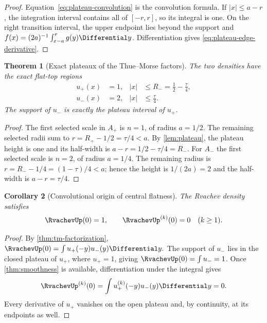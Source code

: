 \documentclass[11pt,oneside]{article}
\numberwithin{equation}{section}
\newtheorem{theorem}{Theorem}[section]
\newtheorem{corollary}[theorem]{Corollary}
\theoremstyle{definition}
\theoremstyle{remark}
\begin{document}
\begin{proof}
Equation~\eqref{eq:plateau-convolution} is the convolution formula.  If
$|x|\le a-r$, the integration interval contains all of $[-r,r]$, so its integral is one.
On the right transition interval, the upper endpoint lies beyond the support and
$f(x)=(2a)^{-1}\int_{x-a}^r g(y)\Differential y$.  Differentiation gives
\eqref{eq:plateau-edge-derivative}.
\end{proof}

\begin{theorem}[Exact plateaux of the Thue--Morse factors]
\label{thm:exact-plateaux}
The two densities have the exact flat-top regions
\begin{align}
 u_+(x)&=1,
 & |x|&\le R_-=\frac12-\frac\tau4,
 \label{eq:uplus-plateau}\\
 u_-(x)&=2,
 & |x|&\le\frac\tau4.
 \label{eq:uminus-plateau}
\end{align}
The support of $u_-$ is exactly the plateau interval of $u_+$.
\end{theorem}

\begin{proof}
The first selected scale in $A_+$ is $n=1$, of radius $a=1/2$.  The remaining selected
radii sum to $r=R_+-1/2=\tau/4<a$.  By \cref{lem:plateau}, the plateau height is one and
its half-width is $a-r=1/2-\tau/4=R_-$.  For $A_-$ the first selected scale is $n=2$,
of radius $a=1/4$.  The remaining radius is
$r=R_--1/4=(1-\tau)/4<a$; hence the height is $1/(2a)=2$ and the half-width is
$a-r=\tau/4$.
\end{proof}

\begin{corollary}[Convolutional origin of central flatness]
\label{cor:central-flatness}
The Rvachev density satisfies
\begin{equation}
 \RvachevUp(0)=1,
 \qquad
 \RvachevUp^{(k)}(0)=0\quad(k\ge1).
 \label{eq:up-central-flatness}
\end{equation}
\end{corollary}

\begin{proof}
By \cref{thm:tm-factorization},
\(
 \RvachevUp(0)=\int u_+(-y)u_-(y)\Differential y.
\)
The support of $u_-$ lies in the closed plateau of $u_+$, where $u_+=1$, giving
$\RvachevUp(0)=\int u_-=1$.  Once \cref{thm:smoothness} is available, differentiation under the
integral gives
\[
 \RvachevUp^{(k)}(0)=\int u_+^{(k)}(-y)u_-(y)\Differential y=0.
\]
Every derivative of $u_+$ vanishes on the open plateau and, by continuity, at its
endpoints as well.
\end{proof}
\end{document}
